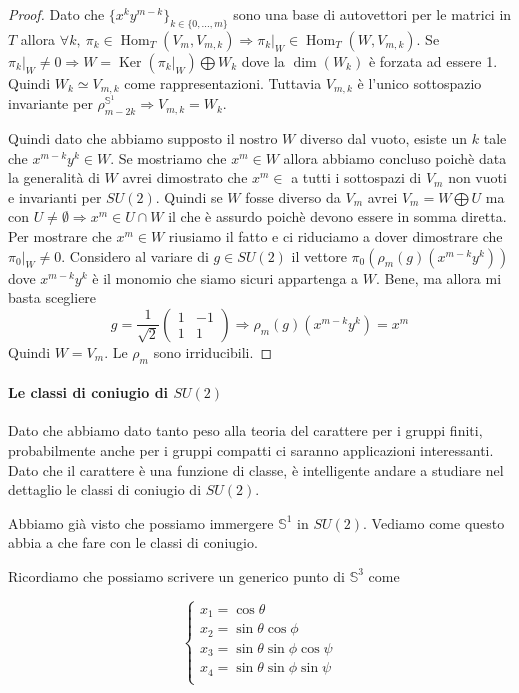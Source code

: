 \documentclass[11pt]{article}
\theoremstyle{plain}
\theoremstyle{definition}
\theoremstyle{remark}
\DeclareMathOperator{\Hom}{Hom}
\DeclareMathOperator{\Ker}{Ker}
\DeclareMathOperator{\iso}{\simeq}
\begin{document}
\begin{proof}
Dato che  $\{ x^ky^{m-k} \}_{k \in \{0, ..., m\}}$ sono una base di autovettori per le matrici in $T$ allora $\forall k,\ \pi_k\in \Hom_T(V_m,V_{m,k} )\Rightarrow \pi_k|_W\in \Hom_T(W,V_{m,k})$. Se $\pi_k|_W\neq 0\Rightarrow W=\Ker(\pi_k|_W)\bigoplus W_k$ dove la $\dim(W_k)$ è forzata ad essere 1. Quindi $W_k\iso V_{m,k}$ come rappresentazioni. Tuttavia $V_{m,k}$ è l'unico sottospazio invariante per $\rho_{m-2k}^{\mathbb{S}^1}\Rightarrow V_{m,k}=W_k$.


Quindi dato che abbiamo supposto il nostro $W$ diverso dal vuoto, esiste un $k$ tale che $x^{m-k}y^k\in W$. Se mostriamo che $x^m\in W$ allora abbiamo concluso poichè data la generalità di $W$ avrei dimostrato che $x^m\in$ a tutti i sottospazi di $V_m$ non vuoti e invarianti per $SU(2)$. Quindi se $W$ fosse diverso da $V_m$ avrei $V_m=W\bigoplus U$ ma con $U\neq \emptyset \Rightarrow x^m\in U\cap W$ il che è assurdo poichè devono essere in somma diretta. Per mostrare che $x^m\in W$ riusiamo il fatto e ci riduciamo a dover dimostrare che $\pi_0|_W\neq 0$. Considero al variare di $g\in SU(2)$ il vettore $\pi_0(\rho_m(g)(x^{m-k}y^k))$ dove $x^{m-k}y^k$ è il monomio che siamo sicuri appartenga a $W$. Bene, ma allora mi basta scegliere
\[g=\frac{1}{\sqrt{2}}\begin{pmatrix}
1& -1\\
 1& 1
\end{pmatrix}\Rightarrow \rho_m(g)(x^{m-k}y^k)=x^m\]
Quindi $W=V_m$. Le $\rho_m$ sono irriducibili.
\end{proof}




 \paragraph{Le classi di coniugio di $SU(2)$}
 Dato che abbiamo dato tanto peso alla teoria del carattere per i gruppi finiti, probabilmente anche per i gruppi compatti ci saranno applicazioni interessanti. Dato che il carattere è una funzione di classe, è intelligente andare a studiare nel dettaglio le classi di coniugio di $SU(2)$.


 Abbiamo già visto che possiamo immergere $\mathbb{S}^1$ in $SU(2)$. Vediamo come questo abbia a che fare con le classi di coniugio.


 Ricordiamo che possiamo scrivere un generico punto di $\mathbb{S}^3$ come

 \[
 \begin{cases}
 x_1 = \cos\theta \\
 x_2 = \sin\theta\cos\phi \\
 x_3 = \sin\theta\sin\phi\cos\psi \\
 x_4 = \sin\theta\sin\phi\sin\psi \\
 \end{cases}
 \]
\end{document}
